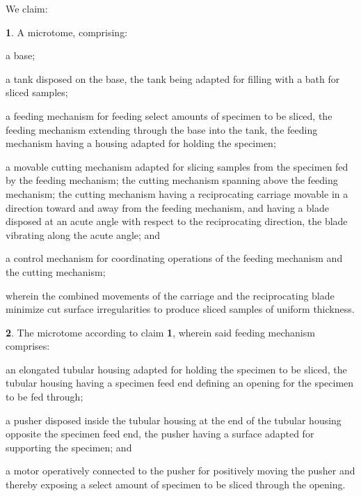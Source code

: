 \documentclass{article}
\begin{document}
\noindent We claim:
\begin{hangpars}
\textbf{1}. A microtome, comprising:

\hspace*{1.5em}a base;

\hspace*{1.5em}a tank disposed on the base, the tank being adapted for filling with a bath for sliced samples;

\hspace*{1.5em}a feeding mechanism for feeding select amounts of specimen to be sliced, the feeding mechanism extending through the base into the tank, the feeding mechanism having a housing adapted for holding the specimen;

\hspace*{1.5em}a movable cutting mechanism adapted for slicing samples from the specimen fed by the feeding mechanism; the cutting mechanism spanning above the feeding mechanism; the cutting mechanism having a reciprocating carriage movable in a direction toward and away from the feeding mechanism, and having a blade disposed at an acute angle with respect to the reciprocating direction, the blade vibrating along the acute angle; and

\hspace*{1.5em}a control mechanism for coordinating operations of the feeding mechanism and the cutting mechanism;

\hspace*{1.5em}wherein the combined movements of the carriage and the reciprocating blade minimize cut surface irregularities to produce sliced samples of uniform thickness.

\textbf{2}. The microtome according to claim \textbf{1}, wherein said feeding mechanism comprises:

\hspace*{1.5em}an elongated tubular housing adapted for holding the specimen to be sliced, the tubular housing having a specimen feed end defining an opening for the specimen to be fed through;

\hspace*{1.5em}a pusher disposed inside the tubular housing at the end of the tubular housing opposite the specimen feed end, the pusher having a surface adapted for supporting the specimen; and

\hspace*{1.5em}a motor operatively connected to the pusher for positively moving the pusher and thereby exposing a select amount of specimen to be sliced through the opening.


\end{hangpars}
\end{document}
